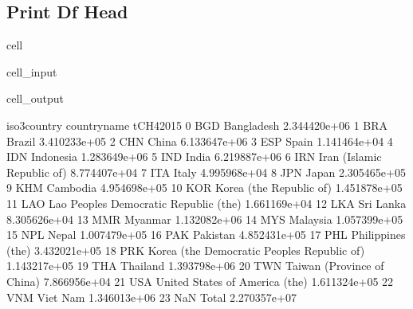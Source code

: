 \documentclass[letterpaper,10pt,english]{jupyterBook}
\begin{document}
\subsection{Print Df Head}
\label{\detokenize{notebooks/data_exploration:print-df-head}}
\begin{sphinxuseclass}{cell}\begin{sphinxVerbatimInput}

\begin{sphinxuseclass}{cell_input}
\begin{sphinxVerbatim}[commandchars=\\\{\}]
\end{sphinxVerbatim}

\end{sphinxuseclass}\end{sphinxVerbatimInput}
\begin{sphinxVerbatimOutput}

\begin{sphinxuseclass}{cell_output}
\begin{sphinxVerbatim}[commandchars=\\\{\}]
   iso3\PYGZus{}country                                 country\PYGZus{}name     tCH4\PYGZus{}2015  \PYGZbs{}
0           BGD                                   Bangladesh  2.344420e+06   
1           BRA                                       Brazil  3.410233e+05   
2           CHN                                        China  6.133647e+06   
3           ESP                                        Spain  1.141464e+04   
4           IDN                                    Indonesia  1.283649e+06   
5           IND                                        India  6.219887e+06   
6           IRN                   Iran (Islamic Republic of)  8.774407e+04   
7           ITA                                        Italy  4.995968e+04   
8           JPN                                        Japan  2.305465e+05   
9           KHM                                     Cambodia  4.954698e+05   
10          KOR                      Korea (the Republic of)  1.451878e+05   
11          LAO       Lao People\PYGZsq{}s Democratic Republic (the)  1.661169e+04   
12          LKA                                    Sri Lanka  8.305626e+04   
13          MMR                                      Myanmar  1.132082e+06   
14          MYS                                     Malaysia  1.057399e+05   
15          NPL                                        Nepal  1.007479e+05   
16          PAK                                     Pakistan  4.852431e+05   
17          PHL                            Philippines (the)  3.432021e+05   
18          PRK  Korea (the Democratic People\PYGZsq{}s Republic of)  1.143217e+05   
19          THA                                     Thailand  1.393798e+06   
20          TWN                   Taiwan (Province of China)  7.866956e+04   
21          USA               United States of America (the)  1.611324e+05   
22          VNM                                     Viet Nam  1.346013e+06   
23          NaN                                        Total  2.270357e+07   


\end{sphinxVerbatim}
\end{sphinxuseclass}
\end{sphinxVerbatimOutput}
\end{sphinxuseclass}
\end{document}

